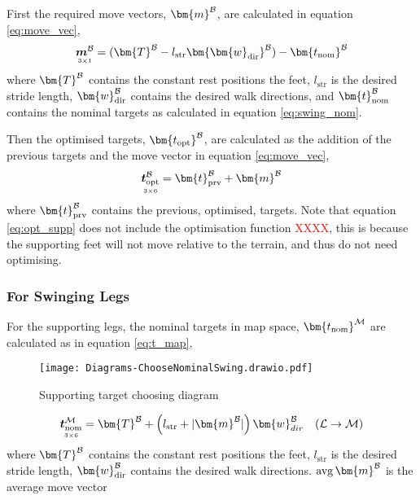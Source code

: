        \noindent
        First the required move vectors, \(\bm{m} ^\fbody\), are calculated in equation \ref{eq:move_vec},
        \begin{equation}\label{eq:move_vec}
            \mdim{\boldsymbol{m}^\fbody}{3}{1} =  (\bm{T}^\fbody - l_\text{str} \bm{\bm{w}_\text{dir}}^\fbody) - \bm{t_\text{nom}}^\fbody
        \end{equation}
        where \(\bm{T}^\fbody\) contains the constant rest positions the feet, \(l_\text{str}\) is the desired stride length, \(\bm{w}_\text{dir}^\fbody\)
        contains the desired walk directions, and \(\bm{t}_\text{nom} ^\fbody\) contains the nominal targets as calculated in
        equation \ref{eq:swing_nom}.

        Then the optimised targets, \(\bm{t_\text{opt}} ^\fbody\), are calculated as the addition of the previous targets and the move vector in equation \ref{eq:move_vec},
        \begin{equation} \label{eq:opt_supp}
            \mdim{\boldsymbol{t}_\text{opt}^\fbody}{3}{6} = \bm{t}_\text{prv}^\fbody + \bm{m}^\fbody
        \end{equation}
        where \(\bm{t}_\text{prv}^\fbody\) contains the previous, optimised, targets. Note that equation \ref{eq:opt_supp} does not include the optimisation
        function \textcolor{red}{XXXX}, this is because the supporting feet will not move relative to the terrain, and thus do not need optimising.

    \newpage
    \subsubsection{For Swinging Legs} \label{sec:swing}
        For the supporting legs, the nominal targets in map space, \(\bm{t_\text{nom}} \inrefframe{M}\) are calculated as in equation \ref{eq:t_map},
        \begin{figure}[h]
            \centering
            \texttt{[image: Diagrams-ChooseNominalSwing.drawio.pdf]}
            \caption{Supporting target choosing diagram} 
            \label{fig:supp_targ}
        \end{figure}
        \begin{equation} \label{eq:t_map}
            \mdim{\boldsymbol{t}_\text{nom}\inrefframe{M}}{3}{6} = \bm{T}^\fbody + \left(l_\text{str}+|\bm{m}^\fbody|\right)\bm{w}_{dir}^\fbody \transframe{L}{M}
        \end{equation}
        where \(\bm{T}^\fbody\) contains the constant rest positions the feet, \(l_\text{str}\) is the desired stride length, \(\bm{w}_\text{dir}^\fbody\)
        contains the desired walk directions. \(\avg\bm{m}^\fbody\) is the average move vector 


